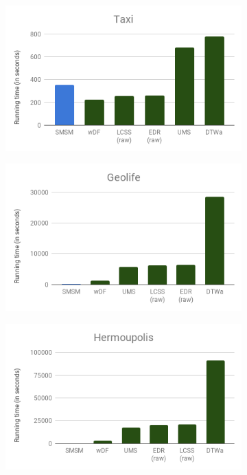 \begin{figure}[ht!]
    \centering
    \begin{subfigure}{0.45\textwidth}
        \includegraphics[width=\linewidth]{Images/running_time_CRAWDAD.png}
        \caption{}
        \label{fig:running_time_crawdad}
    \end{subfigure}
    \begin{subfigure}{0.45\textwidth}
        \includegraphics[width=\linewidth]{Images/running_time_Geolife.png}
        \caption{}
        \label{fig:running_time_geolife}
    \end{subfigure}\hfill %
    \begin{subfigure}[c]{0.5\textwidth}
        \centering
        \includegraphics[width=\linewidth]{Images/running_time_Hermoupolis.png}

\end{subfigure}
\end{figure}
